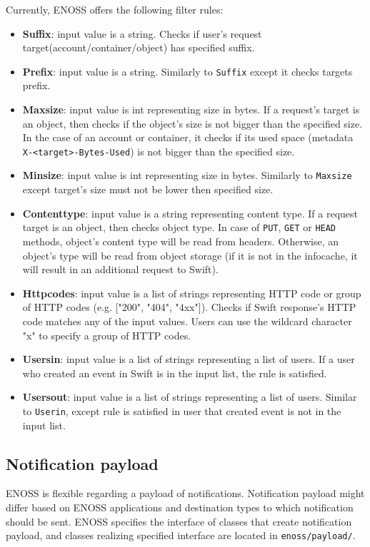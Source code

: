     Currently, ENOSS offers the following filter rules:
    \begin{itemize}
        \item \textbf{Suffix}: input value is a string. Checks if user's request target(account/container/object) has specified suffix.
        \item \textbf{Prefix}: input value is a string. Similarly to \texttt{Suffix} except it checks targets prefix.
        \item \textbf{Maxsize}: input value is int representing size in bytes. If a request's target is an object, then checks if the object's size is not bigger than the specified size. In the case of an account or container, it checks if its used space (metadata \texttt{X-<target>-Bytes-Used}) is not bigger than the specified size.
        \item \textbf{Minsize}: input value is int representing size in bytes. Similarly to \texttt{Maxsize} except target's size must not be lower then specified size.
        \item \textbf{Contenttype}: input value is a string representing content type. If a request target is an object, then checks object type. In case of \texttt{PUT}, \texttt{GET} or \texttt{HEAD} methods, object's content type will be read from headers. Otherwise, an object's type will be read from object storage (if it is not in the infocache, it will result in an additional request to Swift).
        \item \textbf{Httpcodes}: input value is a list of strings representing HTTP code or group of HTTP codes (e.g. ["200", "404", "4xx"]). Checks if Swift response's HTTP code matches any of the input values. Users can use the wildcard character "x" to specify a group of HTTP codes.
        \item \textbf{Usersin}: input value is a list of strings representing a list of users. If a user who created an event in Swift is in the input list, the rule is satisfied.
        \item \textbf{Usersout}: input value is a list of strings representing a list of users. Similar to \texttt{Userin}, except rule is satisfied in user that created event is not in the input list.
    \end{itemize}

    \subsection{Notification payload}
    ENOSS is flexible regarding a payload of notifications. Notification payload might differ based on ENOSS applications and destination types to which notification should be sent. ENOSS specifies the interface of classes that create notification payload, and classes realizing specified interface are located in \texttt{enoss/payload/}.

